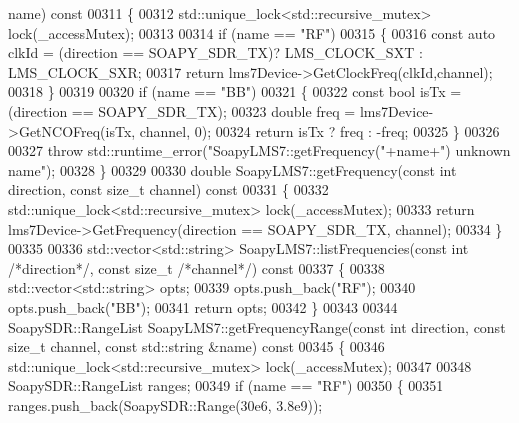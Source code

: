 \begin{DoxyCode}
{{{{{{{{{{{      name)\textcolor{keyword}{ const}
00311 \textcolor{keyword}{}\{
00312     std::unique\_lock<std::recursive\_mutex> lock(_accessMutex);
00313 
00314     \textcolor{keywordflow}{if} (name == \textcolor{stringliteral}{"RF"})
00315     \{
00316         \textcolor{keyword}{const} \textcolor{keyword}{auto} clkId = (direction == SOAPY\_SDR\_TX)? LMS_CLOCK_SXT : 
      LMS_CLOCK_SXR;
00317         \textcolor{keywordflow}{return} lms7Device->GetClockFreq(clkId,channel);
00318     \}
00319 
00320     \textcolor{keywordflow}{if} (name == \textcolor{stringliteral}{"BB"})
00321     \{
00322         \textcolor{keyword}{const} \textcolor{keywordtype}{bool} isTx = (direction == SOAPY\_SDR\_TX);
00323         \textcolor{keywordtype}{double} freq = lms7Device->GetNCOFreq(isTx, channel, 0);
00324         \textcolor{keywordflow}{return} isTx ? freq : -freq;
00325     \}
00326 
00327     \textcolor{keywordflow}{throw} std::runtime\_error(\textcolor{stringliteral}{"SoapyLMS7::getFrequency("}+name+\textcolor{stringliteral}{") unknown name"});
00328 \}
00329 
00330 \textcolor{keywordtype}{double} SoapyLMS7::getFrequency(\textcolor{keyword}{const} \textcolor{keywordtype}{int} direction, \textcolor{keyword}{const} \textcolor{keywordtype}{size\_t} channel)\textcolor{keyword}{ const}
00331 \textcolor{keyword}{}\{
00332     std::unique\_lock<std::recursive\_mutex> lock(_accessMutex);
00333     \textcolor{keywordflow}{return} lms7Device->GetFrequency(direction == SOAPY\_SDR\_TX, channel);
00334 \}
00335 
00336 std::vector<std::string> SoapyLMS7::listFrequencies(\textcolor{keyword}{const} \textcolor{keywordtype}{int} \textcolor{comment}{/*direction*/}, \textcolor{keyword}{const} \textcolor{keywordtype}{size\_t} \textcolor{comment}{/*channel*/})\textcolor{keyword}{
       const}
00337 \textcolor{keyword}{}\{
00338     std::vector<std::string> opts;
00339     opts.push\_back(\textcolor{stringliteral}{"RF"});
00340     opts.push\_back(\textcolor{stringliteral}{"BB"});
00341     \textcolor{keywordflow}{return} opts;
00342 \}
00343 
00344 SoapySDR::RangeList SoapyLMS7::getFrequencyRange(\textcolor{keyword}{const} \textcolor{keywordtype}{int} direction, \textcolor{keyword}{const} \textcolor{keywordtype}{size\_t} channel, \textcolor{keyword}{const} 
      std::string &name)\textcolor{keyword}{ const}
00345 \textcolor{keyword}{}\{
00346     std::unique\_lock<std::recursive\_mutex> lock(_accessMutex);
00347 
00348     SoapySDR::RangeList ranges;
00349     \textcolor{keywordflow}{if} (name == \textcolor{stringliteral}{"RF"})
00350     \{
00351         ranges.push\_back(SoapySDR::Range(30e6, 3.8e9));
}}}}}}}}}}}
\end{DoxyCode}
